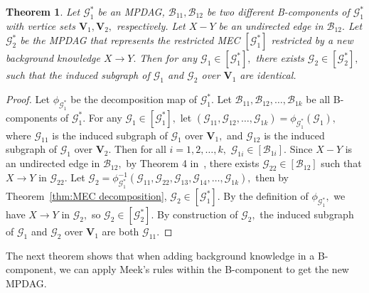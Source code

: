 \documentclass{article}
\newtheorem{theorem}{Theorem}
\begin{document}
\begin{theorem}
Let $\mathcal{G}^*_1$ be an MPDAG, $\mathcal{B}_{11},\mathcal{B}_{12}$ be two different B-components of $\mathcal{G}^*_1$ with vertice sets $\mathbf{V}_1,\mathbf{V}_2,$ respectively. Let $X-Y$ be an undirected edge in $\mathcal{B}_{12}.$ Let $\mathcal{G}^*_2$ be the MPDAG that represents the restricted MEC $[\mathcal{G}^*_1]$ restricted by a new background knowledge $X\to Y.$ Then for any $\mathcal{G}_1\in [\mathcal{G}^*_1],$ there exists $\mathcal{G}_2\in [\mathcal{G}^*_2],$ such that the induced subgraph of $\mathcal{G}_1$ and $\mathcal{G}_2$ over $\mathbf{V}_1$ are identical.
\end{theorem}
\begin{proof}
Let $\phi_{\mathcal{G}^*_1}$ be the decomposition map of $\mathcal{G}^*_1$. Let $\mathcal{B}_{11},\mathcal{B}_{12},\dots,\mathcal{B}_{1k}$ be all B-components of $\mathcal{G}^*_1.$ For any $\mathcal{G}_1\in [\mathcal{G}^*_1],$ let $(\mathcal{G}_{11},\mathcal{G}_{12},\dots,\mathcal{G}_{1k})=\phi_{\mathcal{G}^*_1}(\mathcal{G}_1),$ where $\mathcal{G}_{11}$ is the induced subgraph of $\mathcal{G}_1$ over $\mathbf{V}_1,$ and $\mathcal{G}_{12}$ is the induced subgraph of $\mathcal{G}_1$ over $\mathbf{V}_2.$ Then for all $i=1,2,\dots,k,$ $\mathcal{G}_{1i}\in [\mathcal{B}_{1i}].$ Since $X-Y$ is an undirected edge in $\mathcal{B}_{12},$ by Theorem 4 in~\citet{meek1995causal}, there exists $\mathcal{G}_{22}\in [\mathcal{B}_{12}]$ such that $X\to Y$ in $\mathcal{G}_{22}.$ Let $\mathcal{G}_2=\phi^{-1}_{\mathcal{G}^*_1}(\mathcal{G}_{11},\mathcal{G}_{22},\mathcal{G}_{13},\mathcal{G}_{14},\dots,\mathcal{G}_{1k}),$ then by Theorem~\ref{thm:MEC decomposition}, $\mathcal{G}_2\in [\mathcal{G}^*_1].$ By the definition of $\phi_{\mathcal{G}^*_1},$ we have $X\to Y$ in $\mathcal{G}_2,$ so $\mathcal{G}_2\in [\mathcal{G}^*_2].$ By construction of $\mathcal{G}_2,$ the induced subgraph of $\mathcal{G}_1$ and $\mathcal{G}_2$ over $\mathbf{V}_1$ are both $\mathcal{G}_{11}.$
\end{proof}

The next theorem shows that when adding background knowledge in a B-component, we can apply Meek's rules within the B-component to get the new MPDAG.
\end{document}
